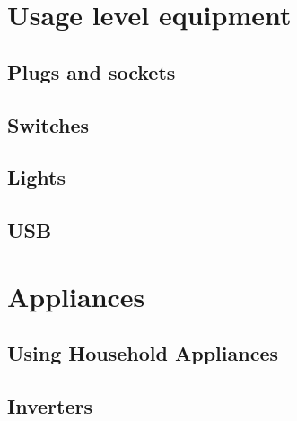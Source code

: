 \documentclass{article}
\theoremstyle{definition}
\theoremstyle{definition}
\theoremstyle{remark}
\begin{document}
\section{Usage level equipment} %
\label{sec:usage_level_equipment}

  \subsection{Plugs and sockets} %
  \label{sub:plugs_and_sockets}
  

  \subsection{Switches} %
  \label{sub:switches}
  

  \subsection{Lights} %
  \label{sub:lights}
  

  \subsection{USB} %
  \label{sub:usb}
  


\section{Appliances} %
\label{sec:appliances}

  \subsection{Using Household Appliances} %
  \label{sub:using_household_appliances}
  

  \subsection{Inverters} %
  \label{sub:inverters}
  
\end{document}

